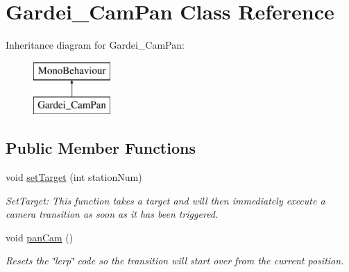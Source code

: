 \hypertarget{class_gardei___cam_pan}{}\section{Gardei\+\_\+\+Cam\+Pan Class Reference}
\label{class_gardei___cam_pan}
Inheritance diagram for Gardei\+\_\+\+Cam\+Pan\+:\begin{figure}[H]
\begin{center}
\leavevmode
\includegraphics[height=2.000000cm]{class_gardei___cam_pan}
\end{center}
\end{figure}
\subsection*{Public Member Functions}
\begin{DoxyCompactItemize}
\item 
void \hyperlink{class_gardei___cam_pan_a3800f7be72b1b6b893e00e2c6248bcba}{set\+Target} (int station\+Num)
\begin{DoxyCompactList}\small\item\em Set\+Target\+: This function takes a target and will then immediately execute a camera transition as soon as it has been triggered. \end{DoxyCompactList}\item 
void \hyperlink{class_gardei___cam_pan_a6ae5373621faf797c67ad4eb961f40ca}{pan\+Cam} ()
\begin{DoxyCompactList}\small\item\em Resets the \char`\"{}lerp\char`\"{} code so the transition will start over from the current position. \end{DoxyCompactList}\end{DoxyCompactItemize}
